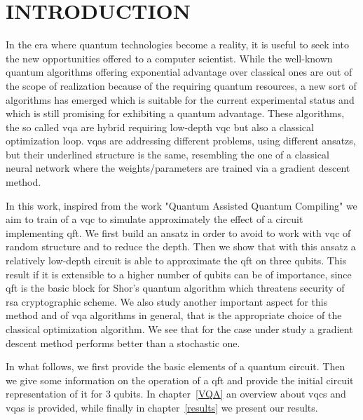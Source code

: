 \documentclass[inscr,ack,preface]{diphdthesis}
\begin{document}
\frontmatter
{} %



\mainmatter

\chapter{INTRODUCTION}

In the era where quantum technologies become a reality, it is useful to seek into the 
new opportunities offered to a computer scientist. While the well-known quantum algorithms
offering exponential advantage over classical ones are out of the scope of realization because of
the requiring  quantum resources, a new sort of algorithms  has emerged
which is suitable for the current experimental status and which is still promising for exhibiting a quantum advantage.
These algorithms,  the so called \acrfull{vqa} are hybrid requiring low-depth \acrfull{vqc} but also a classical optimization loop. \acrshort{vqa}s are addressing different problems, using different ansatzs, but their underlined structure
is the same, resembling the one of a classical neural network where the weights/parameters are trained via a gradient descent method. 

In this work, inspired from the work "Quantum Assisted Quantum Compiling"\cite{paper} we aim to train of a \acrshort{vqc} to simulate approximately 
the effect of a circuit implementing \acrfull{qft}. We first build an ansatz in order to avoid to work with \acrshort{vqc} of random structure and to  reduce the depth. Then we show that with this ansatz a relatively low-depth circuit is able to approximate the \acrshort{qft} on three \acrshort{qubit}s. This result if it is extensible to a higher number of \acrshort{qubit}s can be of importance, since \acrshort{qft} is the basic block for Shor's quantum algorithm which threatens security of \acrshort{rsa} cryptographic scheme.
We also study another important aspect for this method and of \acrshort{vqa} algorithms in general, that is the appropriate choice
of the classical optimization algorithm. We see that for the case under study a gradient descent method performs better
than a stochastic one.
 
 In what follows, we first provide the basic elements of a quantum circuit. Then we give some information on
the operation of a \acrshort{qft} and provide the initial circuit representation of it for $3$ \acrshort{qubit}s. In chapter~\ref{VQA} an overview about
\acrshort{vqc}s and \acrshort{vqa}s is provided, while finally in chapter~\ref{results} we present our results.
\end{document}
